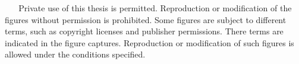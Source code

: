 {%
  \copyrighttext%
  {\copyrightmetastring\ \allrightsreservedeng}%
  {%
    \copyrightstring\ \allrightsreservedeng
    \blockpar
    Private use of this thesis is permitted. Reproduction or
    modification of the figures without permission is prohibited.
    \blockpar
    Some figures are subject to different terms, such as copyright
    licenses and publisher permissions. There terms are indicated in
    the figure captures. Reproduction or modification of such figures
    is allowed under the conditions specified.
  }
}
